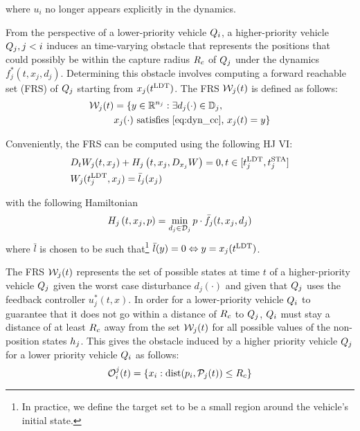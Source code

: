 \noindent where $u_i$ no longer appears explicitly in the dynamics.

From the perspective of a lower-priority vehicle $Q_i$, a higher-priority vehicle $Q_j, j < i$ induces an time-varying obstacle that represents the positions that could possibly be within the capture radius $R_c$ of $Q_j$ under the dynamics $f^*_j(t, x_j, d_j)$. Determining this obstacle involves computing a forward reachable set (FRS) of $Q_j$ starting from $x_j(t^\text{LDT})$. The FRS $\mathcal{W}_j(t)$ is defined as follows:
\vspace{-0.3em}
\begin{equation}
\label{eq:FRS1}
\begin{aligned}
\mathcal{W}_j(t) &= \{y \in \mathbb{R}^{n_j}: \exists d_j(\cdot) \in \mathbb{D}_j, \\
&x_j(\cdot) \text{ satisfies \eqref{eq:dyn_cc}, }x_j(t) = y\}
\end{aligned}
\end{equation}

Conveniently, the FRS can be computed using the following HJ VI:
\vspace{-0.4em}
\begin{equation}
\label{eq:FRS_HJIVI}
\begin{aligned}
&D_t W_j(t, x_j) + H_j\left(t, x_j, D_{x_j} W\right) = 0, t \in [t^\text{LDT}_j, t^\text{STA}_j]\\
&W_j(t^\text{LDT}_j, x_j) = \bar l_j(x_j) \\
\end{aligned}
\end{equation}

\noindent with the following Hamiltonian
\begin{equation}
H_j\left(t, x_j, p\right) = \min_{d_j \in \mathcal{D}_j} p \cdot \bar f_j(t, x_j, d_j)
\end{equation}
\noindent where $\bar l$ is chosen to be such that\footnote{In practice, we define the target set to be a small region around the vehicle's initial state.} $\bar l (y) = 0 \Leftrightarrow y = x_j(t^\text{LDT})$.

The FRS $\mathcal{W}_j(t)$ represents the set of possible states at time $t$ of a higher-priority vehicle $Q_j$ given the worst case disturbance $d_j(\cdot)$ and given that $Q_j$ uses the feedback controller $u_j^*(t, x)$. In order for a lower-priority vehicle $Q_i$ to guarantee that it does not go within a distance of $R_c$ to $Q_j$, $Q_i$ must stay a distance of at least $R_c$ away from the set $\mathcal{W}_j(t)$ for all possible values of the non-position states $h_j$. This gives the obstacle induced by a higher priority vehicle $Q_j$ for a lower priority vehicle $Q_i$ as follows:
\vspace{-0.4em}
\begin{equation}
\mathcal{O}_i^j(t) = \{x_i: \text{dist}(p_i, \mathcal{P}_j(t)) \le R_c \}
\end{equation}

